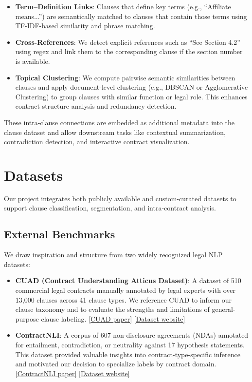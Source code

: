 \documentclass[11pt, oneside]{article}   	%
\begin{document}
\begin{itemize}
    \item \textbf{Term--Definition Links}: Clauses that define key terms (e.g., “Affiliate means...”) are semantically matched to clauses that contain those terms using TF-IDF-based similarity and phrase matching.
    
    \item \textbf{Cross-References}: We detect explicit references such as “See Section 4.2” using regex and link them to the corresponding clause if the section number is available.
    
    \item \textbf{Topical Clustering}: We compute pairwise semantic similarities between clauses and apply document-level clustering (e.g., DBSCAN or Agglomerative Clustering) to group clauses with similar function or legal role. This enhances contract structure analysis and redundancy detection.
\end{itemize}

These intra-clause connections are embedded as additional metadata into the clause dataset and allow downstream tasks like contextual summarization, contradiction detection, and interactive contract visualization.


\section*{Datasets}

Our project integrates both publicly available and custom-curated datasets to support clause classification, segmentation, and intra-contract analysis.

\subsection*{External Benchmarks}

We draw inspiration and structure from two widely recognized legal NLP datasets:

\begin{itemize}
    \item \textbf{CUAD (Contract Understanding Atticus Dataset)}: A dataset of 510 commercial legal contracts manually annotated by legal experts with over 13,000 clauses across 41 clause types. We reference CUAD to inform our clause taxonomy and to evaluate the strengths and limitations of general-purpose clause labeling. \href{https://arxiv.org/abs/2103.06268}{[CUAD paper]} \href{https://www.atticusprojectai.org/cuad}{[Dataset website]}

    \item \textbf{ContractNLI}: A corpus of 607 non-disclosure agreements (NDAs) annotated for entailment, contradiction, or neutrality against 17 hypothesis statements. This dataset provided valuable insights into contract-type-specific inference and motivated our decision to specialize labels by contract domain. \href{https://aclanthology.org/2021.emnlp-main.14}{[ContractNLI paper]} \href{https://stanfordnlp.github.io/contract-nli/}{[Dataset website]}
\end{itemize}
\end{document}
